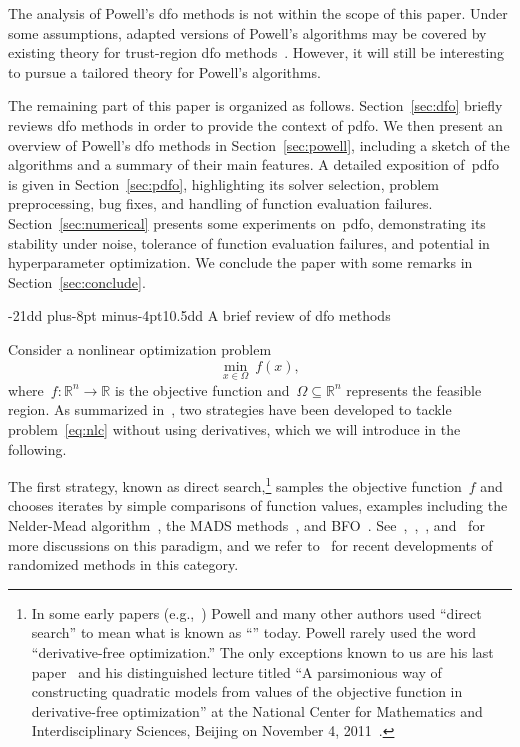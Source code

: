 \documentclass[
    smallextended,  %
    final,          %
]{svjour3}
\makeatletter
\newcommand{\R}{\mathbb{R}}
\newcommand{\fset}{\Omega}
\newcommand{\obj}{f}
\def\section{\@startsection{section}{1}{\z@}%
    {-21dd plus-8pt minus-4pt}{10.5dd}
    {\sffamily\normalsize\bfseries\boldmath}}
\makeatother
\begin{document}
The analysis of Powell's \gls{dfo} methods is not within the scope of this paper.
Under some assumptions, adapted versions of Powell's algorithms may be covered by existing theory for trust-region \gls{dfo} methods~\cite[Chapter~10]{Conn_Scheinberg_Vicente_2009b}.
However, it will still be interesting to pursue a tailored theory for Powell's algorithms.

The remaining part of this paper is organized as follows.
Section~\ref{sec:dfo} briefly reviews \gls{dfo} methods in order to provide the context of \gls{pdfo}.
We then present an overview of Powell's \gls{dfo} methods in Section~\ref{sec:powell}, including a sketch of the algorithms and a summary of their main features.
A detailed exposition of~\gls{pdfo} is given in Section~\ref{sec:pdfo}, highlighting its solver selection, problem preprocessing, bug fixes, and handling of function evaluation failures.
Section~\ref{sec:numerical} presents some experiments on~\gls{pdfo}, demonstrating its stability under noise, tolerance of function evaluation failures, and potential in hyperparameter optimization.
We conclude the paper with some remarks in Section~\ref{sec:conclude}.

\section{A brief review of \texorpdfstring{\gls{dfo}}{DFO} methods}
\label{sec:dfo}

Consider a nonlinear optimization problem
\begin{equation}
    \label{eq:nlc}
    \min_{x \in \fset} ~ \obj(x),
\end{equation}
where~$\obj \colon \R^n \to \R$ is the objective function and~$\fset \subseteq \R^n$ represents the feasible region.
As summarized in~\cite{Conn_Scheinberg_Vicente_2009b}, two strategies have been developed to tackle problem~\eqref{eq:nlc} without using derivatives, which we will introduce in the following.

The first strategy, known as direct search,\footnote{In some early papers (e.g.,~\cite{Powell_1994,Powell_1998}) Powell and many other authors used ``direct search'' to mean what is known as ``'' today.
Powell rarely used the word ``derivative-free optimization.''
The only exceptions known to us are his last paper~\cite{Powell_2015} and his distinguished lecture titled ``A parsimonious way of constructing quadratic models from values of the objective function in derivative-free optimization'' at the National Center for Mathematics and Interdisciplinary Sciences, Beijing on November 4, 2011~\cite{Buhmann_Fletcher_Iserles_Toint_2018}.} samples the objective function~$\obj$ and chooses iterates by simple comparisons of function values, examples including the Nelder-Mead algorithm~\cite{Nelder_Mead_1965}, the MADS methods~\cite{Audet_Dennis_2006,LeDigabel_2011}, and BFO~\cite{Porcelli_Toint_2017,Porcelli_Toint_2022}.
See~\cite{Kolda_Lewis_Torczon_2003},~\cite[Chapters~7 and~8]{Conn_Scheinberg_Vicente_2009b},~\cite[Part~3]{Audet_Hare_2017}, and~\cite[\S~2.1]{Larson_Menickelly_Wild_2019} for more discussions on this paradigm, and we refer to~\cite{Gratton_Etal_2015,Gratton_Etal_2019} for recent developments of randomized methods in this category.
\end{document}
